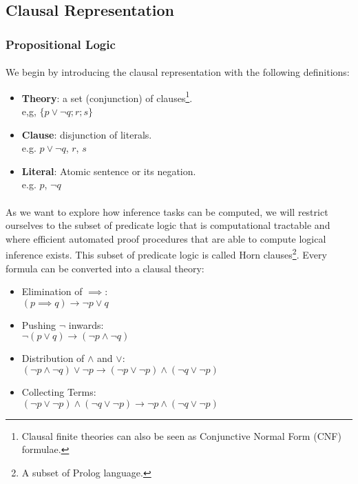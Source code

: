 \documentclass{article}
\theoremstyle{plain}
\theoremstyle{definition}
\begin{document}
\begin{multicols}{2}
\subsection{Clausal Representation}
\subsubsection{Propositional Logic}
\paragraph{} We begin by introducing the clausal representation with the following definitions:

\begin{itemize}
\item \textbf{Theory}: a set (conjunction) of clauses\footnote{Clausal finite theories can also be seen as Conjunctive Normal Form (CNF) formulae.}.\\ e,g, $\{p \lor \lnot q; r; s\}$
\item \textbf{Clause}: disjunction of literals.\\ e.g. $p \lor \lnot q$, $r$, $s$
\item \textbf{Literal}: Atomic sentence or its negation.\\ e.g. $p$, $\lnot q$
\end{itemize}

\paragraph{} As we want to explore how inference tasks can be computed, we will restrict ourselves to the subset of predicate logic that is computational tractable and where efficient automated proof procedures that are able to compute logical inference exists. This subset of predicate logic is called Horn clauses\footnote{A subset of Prolog language.}. Every formula can be converted into a clausal theory:

\begin{itemize}
\item Elimination of $\implies$:\\ $(p \implies q) \longrightarrow \lnot p \lor q$
\item Pushing $\lnot$ inwards:\\ $\lnot(p \lor q) \longrightarrow (\lnot p \land \lnot q)$
\item Distribution of $\land$ and $\lor$:\\ $(\lnot p \land \lnot q) \lor \lnot p \longrightarrow (\lnot p \lor \lnot p) \land (\lnot q \lor \lnot p)$
\item Collecting Terms:\\ $(\lnot p \lor \lnot p) \land (\lnot q \lor \lnot p) \longrightarrow \lnot p \land (\lnot q \lor \lnot p)$
\end{itemize}


\end{multicols}
\end{document}
